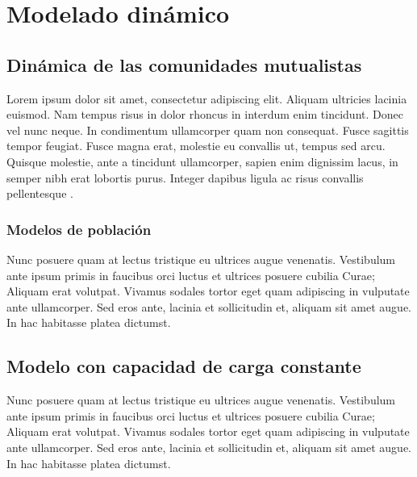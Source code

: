 
\chapter{Modelado dinámico} %

\label{DINAMICA} %


\section{Dinámica de las comunidades mutualistas}

Lorem ipsum dolor sit amet, consectetur adipiscing elit. Aliquam ultricies lacinia euismod. Nam tempus risus in dolor rhoncus in interdum enim tincidunt. Donec vel nunc neque. In condimentum ullamcorper quam non consequat. Fusce sagittis tempor feugiat. Fusce magna erat, molestie eu convallis ut, tempus sed arcu. Quisque molestie, ante a tincidunt ullamcorper, sapien enim dignissim lacus, in semper nibh erat lobortis purus. Integer dapibus ligula ac risus convallis pellentesque \citep{Reference3}.

\subsection{Modelos de población}

Nunc posuere quam at lectus tristique eu ultrices augue venenatis. Vestibulum ante ipsum primis in faucibus orci luctus et ultrices posuere cubilia Curae; Aliquam erat volutpat. Vivamus sodales tortor eget quam adipiscing in vulputate ante ullamcorper. Sed eros ante, lacinia et sollicitudin et, aliquam sit amet augue. In hac habitasse platea dictumst.

\section{Modelo con capacidad de carga constante}

Nunc posuere quam at lectus tristique eu ultrices augue venenatis. Vestibulum ante ipsum primis in faucibus orci luctus et ultrices posuere cubilia Curae; Aliquam erat volutpat. Vivamus sodales tortor eget quam adipiscing in vulputate ante ullamcorper. Sed eros ante, lacinia et sollicitudin et, aliquam sit amet augue. In hac habitasse platea dictumst.

